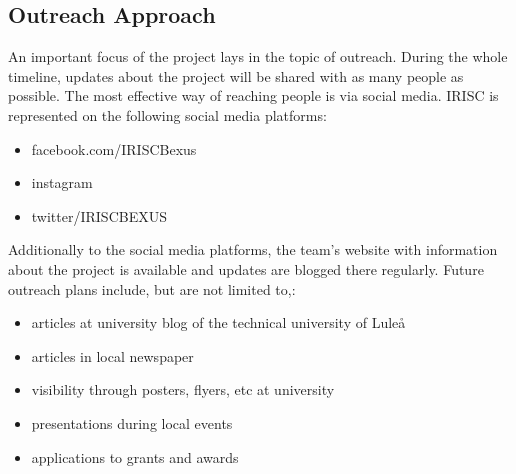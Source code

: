
\subsection{Outreach Approach}
An important focus of the project lays in the topic of outreach. During the whole timeline, updates about the project will be shared with as many people as possible. The most effective way of reaching people is via social media. IRISC is represented on the following social media platforms:
\begin{itemize}
	\item facebook.com/IRISCBexus
	\item instagram
	\item twitter/IRISCBEXUS
\end{itemize}
Additionally to the social media platforms, the team's website with information about the project is available and updates are blogged there regularly.\newline\newline
Future outreach plans include, but are not limited to,:
\begin{itemize}
	\item articles at university blog of the technical university of Lule\aa
	\item articles in local newspaper
	\item visibility through posters, flyers, etc at university
	\item presentations during local events
	\item applications to grants and awards
\end{itemize}

